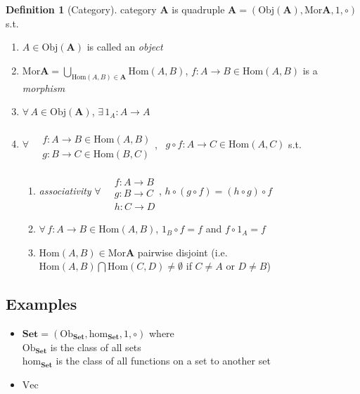 \documentclass[twoside,landscape,10pt]{amsart}
\theoremstyle{plain}
\theoremstyle{definition}
\newtheorem{definition}{Definition}
\theoremstyle{remark}
\begin{document}
\begin{multicols*}{2}
\begin{definition}[Category]
category $\mathbf{A}$ is quadruple $\mathbf{A} = (\text{Obj}(\mathbf{A}), \text{Mor}\mathbf{A}, 1,\circ)$ s.t.
\begin{enumerate}
  \item $A \in \text{Obj}(\mathbf{A})$ is called an \emph{object}
  \item $\text{Mor}\mathbf{A} = \bigcup_{ \text{Hom}(A,B) \in \mathbf{A}} \text{Hom}(A,B)$, $f: A \to B \in \text{Hom}(A,B)$ is a \emph{morphism}
  \item $\forall \, A \in \text{Obj}(\mathbf{A})$, $\exists \, 1_A : A \to A$
  \item $\forall \, \begin{aligned} & \quad \\
    & f: A \to B \in \text{Hom}(A,B) \\
    & g:B\to C \in \text{Hom}(B,C) \end{aligned}$, \qquad \, $g\circ f : A \to C \in \text{Hom}(A,C)$ s.t. 
\begin{enumerate}
  \item \emph{associativity} $\forall \, \begin{aligned} & \quad \\
    & f: A \to B \\
    & g: B \to C \\
    & h: C \to D \end{aligned}$, $h\circ (g\circ f) = (h\circ g) \circ f $ 
\item $\forall \, f:A \to B \in \text{Hom}(A,B)$, $1_B \circ f = f $ and $f\circ 1_A = f$ 
\item $\text{Hom}(A,B) \in \text{Mor}\mathbf{A}$ pairwise disjoint (i.e. $\text{Hom}(A,B) \bigcap \text{Hom}(C,D) \neq \emptyset$ if $C\neq A$ or $D\neq B$)
\end{enumerate}
\end{enumerate}


\end{definition}


\subsection{Examples}

\begin{itemize}
  \item $\mathbf{\text{Set}} = (\text{Ob}_{\mathbf{\text{Set}}}, \text{hom}_{\mathbf{\text{Set}}},1,\circ)$ where \\
$\text{Ob}_{\mathbf{\text{Set}}}$ is the class of all sets \\
$\text{hom}_{\mathbf{\text{Set}}}$ is the class of all functions on a set to another set
\item $\text{Vec}$


\end{itemize}
\end{multicols*}
\end{document}
